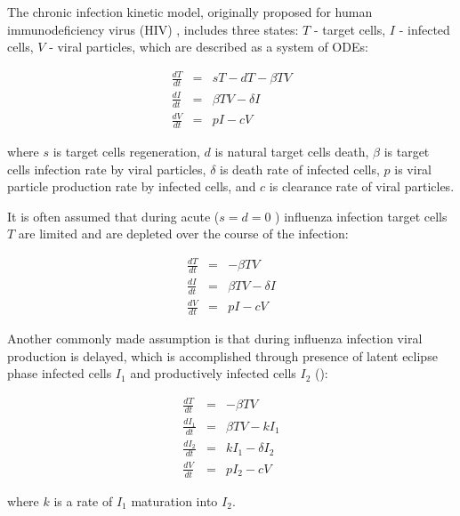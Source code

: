 The chronic infection kinetic model, originally proposed for human immunodeficiency virus (HIV) \cite{perelson2002modelling}, includes three states: $T$ - target cells, $I$ - infected cells, $V$ - viral particles, which are described as a system of ODEs:

\begin{equation}
\begin{array}{rcl}
\frac{dT}{dt} &=& s T - d T - \beta T V \\
\frac{dI}{dt} &=& \beta T V - \delta I \\
\frac{dV}{dt} &=& p I - c V
\end{array}
\end{equation}

where $s$ is target cells regeneration, $d$ is natural target cells death, $\beta$ is target cells infection rate by viral particles, $\delta$ is death rate of infected cells, $p$ is viral particle production rate by infected cells, and $c$ is clearance rate of viral particles.

It is often assumed that during acute ($s = d = 0$ \cite{baccam2006kinetics}) influenza infection target cells $T$ are limited and are depleted over the course of the infection:

\begin{equation}
\begin{array}{rcl}
\frac{dT}{dt} &=& - \beta T V \\
\frac{dI}{dt} &=& \beta T V - \delta I \\
\frac{dV}{dt} &=& p I - c V
\end{array}
\end{equation}

Another commonly made assumption is that during influenza infection viral production is delayed, which is accomplished through presence of latent eclipse phase infected cells $I_1$ and productively infected cells $I_2$ (\cite{baccam2006kinetics, smith2011effect}):

\begin{equation}
\begin{array}{rcl}
\frac{dT}{dt} &=& - \beta T V \\
\frac{dI_1}{dt} &=& \beta T V - k I_1 \\
\frac{dI_2}{dt} &=& k I_1 - \delta I_2 \\
\frac{dV}{dt} &=& p I_2 - c V
\end{array}
\end{equation}

where $k$ is a rate of $I_1$ maturation into $I_2$.

